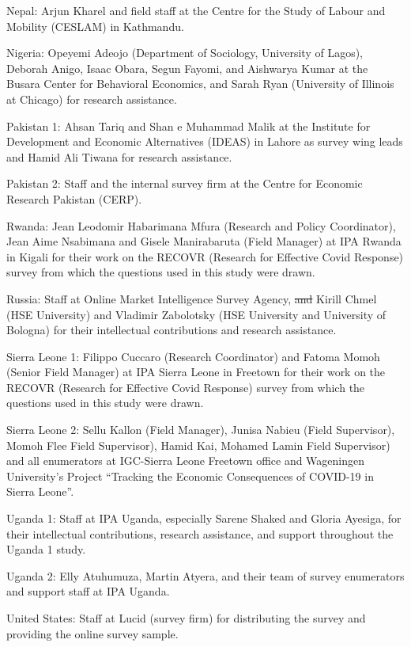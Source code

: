 \documentclass[
  12pt,
]{article}
\providecommand{\DIFaddtex}[1]{{\protect\color{blue}\uwave{#1}}} %
\providecommand{\DIFdeltex}[1]{{\protect\color{red}\sout{#1}}}                      %
\providecommand{\DIFaddbegin}{} %
\providecommand{\DIFaddend}{} %
\providecommand{\DIFdelbegin}{} %
\providecommand{\DIFdelend}{} %
\providecommand{\DIFadd}[1]{\texorpdfstring{\DIFaddtex{#1}}{#1}} %
\providecommand{\DIFdel}[1]{\texorpdfstring{\DIFdeltex{#1}}{}} %
\newcommand{\DIFscaledelfig}{0.5}
\newlength{\DIFdelgraphicswidth} %
\newlength{\DIFdelgraphicsheight} %
\newcommand{\DIFaddincludegraphics}[2][]{{\color{blue}\fbox{\DIFOincludegraphics[#1]{#2}}}} %
\newcommand{\DIFdelincludegraphics}[2][]{%
\sbox{\DIFdelgraphicsbox}{\DIFOincludegraphics[#1]{#2}}%
\settoboxwidth{\DIFdelgraphicswidth}{\DIFdelgraphicsbox} %
\settoboxtotalheight{\DIFdelgraphicsheight}{\DIFdelgraphicsbox} %
\scalebox{\DIFscaledelfig}{%
\parbox[b]{\DIFdelgraphicswidth}{\usebox{\DIFdelgraphicsbox}\\[-\baselineskip] \rule{\DIFdelgraphicswidth}{0em}}\llap{\resizebox{\DIFdelgraphicswidth}{\DIFdelgraphicsheight}{%
\setlength{\unitlength}{\DIFdelgraphicswidth}%
\begin{picture}(1,1)%
\thicklines\linethickness{2pt} %
{\color[rgb]{1,0,0}\put(0,0){\framebox(1,1){}}}%
{\color[rgb]{1,0,0}\put(0,0){\line( 1,1){1}}}%
{\color[rgb]{1,0,0}\put(0,1){\line(1,-1){1}}}%
\end{picture}%
}\hspace*{3pt}}} %
} %
\DeclareRobustCommand{\DIFaddbegin}{\DIFOaddbegin \let\includegraphics\DIFaddincludegraphics} %
\DeclareRobustCommand{\DIFaddend}{\DIFOaddend \let\includegraphics\DIFOincludegraphics} %
\DeclareRobustCommand{\DIFdelbegin}{\DIFOdelbegin \let\includegraphics\DIFdelincludegraphics} %
\DeclareRobustCommand{\DIFdelend}{\DIFOaddend \let\includegraphics\DIFOincludegraphics} %
\begin{document}
Nepal: Arjun Kharel and field staff at the Centre for the Study of Labour and Mobility (CESLAM) in Kathmandu.

Nigeria: Opeyemi Adeojo (Department of Sociology, University of Lagos), Deborah Anigo, Isaac Obara, Segun Fayomi, and Aishwarya Kumar at the Busara Center for Behavioral Economics, and Sarah Ryan (University of Illinois at Chicago) for research assistance.

Pakistan 1: Ahsan Tariq and Shan e Muhammad Malik at the Institute for Development and Economic Alternatives (IDEAS) in Lahore as survey wing leads and Hamid Ali Tiwana for research assistance.

Pakistan 2: Staff and the internal survey firm at the Centre for Economic Research Pakistan (CERP).

Rwanda: Jean Leodomir Habarimana Mfura (Research and Policy Coordinator), Jean Aime Nsabimana and Gisele Manirabaruta (Field Manager) at IPA Rwanda in Kigali for their work on the RECOVR (Research for Effective Covid Response) survey from which the questions used in this study were drawn.

Russia: Staff at Online Market Intelligence Survey Agency, \DIFdelbegin \DIFdel{and }\DIFdelend Kirill Chmel (HSE University) and Vladimir Zabolotsky (HSE University and University of Bologna) for their intellectual contributions and research assistance.

Sierra Leone 1: Filippo Cuccaro (Research Coordinator) and Fatoma Momoh (Senior Field Manager) at IPA Sierra Leone in Freetown for their work on the RECOVR (Research for Effective Covid Response) survey from which the questions used in this study were drawn.

Sierra Leone 2: Sellu Kallon (Field Manager), Junisa Nabieu (Field Supervisor), Momoh Flee \DIFaddbegin \DIFadd{(}\DIFaddend Field Supervisor), Hamid Kai, Mohamed Lamin \DIFaddbegin \DIFadd{(}\DIFaddend Field Supervisor) and all enumerators at IGC-Sierra Leone Freetown office and Wageningen University's Project ``Tracking the Economic Consequences of COVID-19 in Sierra Leone''.

Uganda 1: Staff at IPA Uganda, especially Sarene Shaked and Gloria Ayesiga, for their intellectual contributions, research assistance, and support throughout the Uganda 1 study.

Uganda 2: Elly Atuhumuza, Martin Atyera, and their team of survey enumerators and support staff at IPA Uganda.

United States: Staff at Lucid (survey firm) for distributing the survey and providing the online survey sample.
\end{document}
